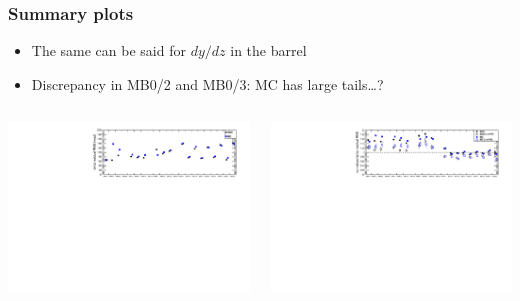\documentclass[compress]{beamer}
\begin{document}
\begin{frame}
\frametitle{Summary plots}

\begin{itemize}
\item The same can be said for $dy/dz$ in the barrel
\item Discrepancy in MB0/2 and MB0/3: MC has large tails\ldots?
\end{itemize}
\begin{columns}
\includegraphics[width=\linewidth]{summarydYdZ.pdf}

\includegraphics[width=\linewidth]{summarydYdZnorm.pdf}



\end{columns}
\end{frame}
\end{document}
